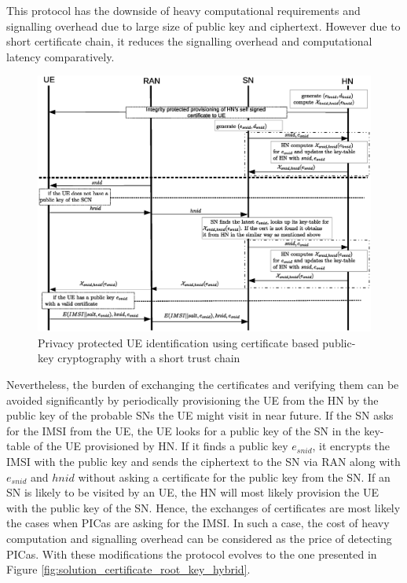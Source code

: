 \documentclass[lnicst,sechang,a4paper]{svmultln}
\begin{document}
This protocol has the downside of heavy computational requirements and signalling overhead due to large size of public key and ciphertext. However due to short certificate chain, it reduces the signalling overhead and computational latency comparatively.

\begin{figure}
\begin{center}
  \includegraphics[width=.98\textwidth]{root-key2.eps}
\caption{Privacy protected UE identification using certificate based public-key cryptography with a short trust chain}
\label{fig:solution_certificate_short_chain}       %
\end{center}
\end{figure}

Nevertheless, the burden of exchanging the certificates and verifying them can be avoided significantly by periodically provisioning the UE from the HN by the public key of the probable SNs the UE might visit in near future. If the SN asks for the IMSI from the UE, the UE looks for a public key of the SN in the key-table of the UE provisioned by HN. If it finds a public key $e_{snid}$, it encrypts the IMSI with the public key and sends the ciphertext to the SN via RAN along with $e_{snid}$ and $hnid$ without asking a certificate for the public key from the SN. If an SN is likely to be visited by an UE, the HN will most likely provision the UE with the public key of the SN. Hence, the exchanges of certificates are most likely the cases when PICas are asking for the IMSI. In such a case, the cost of heavy computation and signalling overhead can be considered as the price of detecting PICas. With these modifications the protocol evolves to the one presented in Figure \ref{fig:solution_certificate_root_key_hybrid}. 
\end{document}
